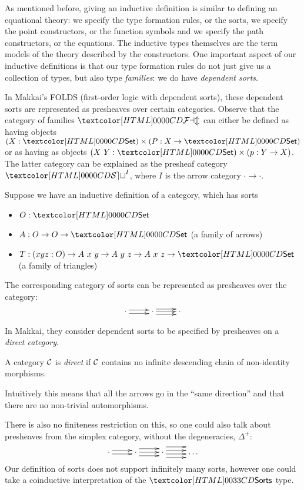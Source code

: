 As mentioned before, giving an inductive definition is similar to
defining an equational theory: we specify the type formation rules, or
the sorts, we specify the point constructors, or the function symbols
and we specify the path constructors, or the equations. The inductive
types themselves are the term models of the theory described by the
constructors. One important aspect of our inductive definitions is
that our type formation rules do not just give us a collection of
types, but also type \emph{families}: we do have \emph{dependent
  sorts}.

In Makkai's FOLDS (first-order logic with dependent sorts), these
dependent sorts are represented as presheaves over certain
categories. Observe that the category of families $\FAM$ can either be
defined as having objects $(X : \Set) \times (P : X \to \Set)$ or as
having as objects $(X\ Y : \Set) \times (p : Y \to X)$. The latter
category can be explained as the presheaf category $\SET^I$, where $I$
is the arrow category $\cdot \to \cdot$.

\begin{example}
  Suppose we have an inductive definition of a category, which has
  sorts
%
  \begin{itemize}
  \item $O : \Set$
  \item $A : O \to O \to \Set$ (a family of arrows)
  \item $T : (x y z : O) \to A\ x\ y \to A\ y\ z \to A\ x\ z \to \Set$
    (a family of triangles)
  \end{itemize}
%
  The corresponding category of sorts can be represented as presheaves
  over the category:
$$
\xymatrix{ \cdot \ar@<-.5ex>[r] \ar@<.5ex>[r] &\cdot \ar@<-.75ex>[r]
  \ar@<.0ex>[r] \ar@<.75ex>[r] &\cdot }
$$
\end{example}

In Makkai, they consider dependent sorts to be specified by presheaves
on a \emph{direct category}.
\begin{definition}
  A category $\mathcal{C}$ is \emph{direct} if $\mathcal{C}$ contains no infinite
  descending chain of non-identity morphisms.
\end{definition}
Intuitively this means that all the arrows go in the ``same
direction'' and that there are no non-trivial automorphisms.

There is also no finiteness restriction on this, so one could also
talk about presheaves from the simplex category, without the
degeneracies, $\Delta^+$:
$$
\xymatrix{
\cdot     
\ar@<-.5ex>[r]
\ar@<.5ex>[r]
&\cdot
\ar@<-1ex>[r]
\ar@<0ex>[r]
\ar@<1ex>[r]
&\cdot
\ar@<-1.5ex>[r]
\ar@<-.5ex>[r]
\ar@<.5ex>[r]
\ar@<1.5ex>[r]
&\hdots
}
$$
Our definition of sorts does not support infinitely many sorts,
however one could take a coinductive interpretation of the $\sortsty$
type.

